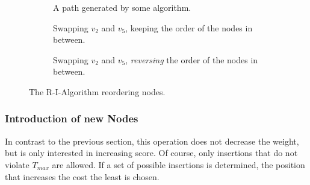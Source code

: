 \begin{figure}
    \centering
    \begin{subfigure}{0.45\textwidth}
        \caption{A path generated by some algorithm.}
        \label{fig:03:rialgoreorderpath}
    \end{subfigure}
    \begin{subfigure}{0.45\textwidth}
        \caption{Swapping $v_2$ and $v_5$, keeping the order of the nodes in between.}
        \label{fig:03:rialgoreorderkeep}
    \end{subfigure}
    \begin{subfigure}{0.45\textwidth}
        \caption{Swapping $v_2$ and $v_5$, \emph{reversing} the order of the nodes in between.}
        \label{fig:03:rialgoreorderreverse}
    \end{subfigure}
    \caption{The R-I-Algorithm reordering nodes.}
    \label{fig:03:rialgoreorder}
\end{figure}

\subsubsection{Introduction of new Nodes}

In contrast to the previous section, this operation does not decrease the weight, but is only interested in increasing score.
Of course, only insertions that do not violate $T_{max}$ are allowed.
If a set of possible insertions is determined, the position that increases the cost the least is chosen.

